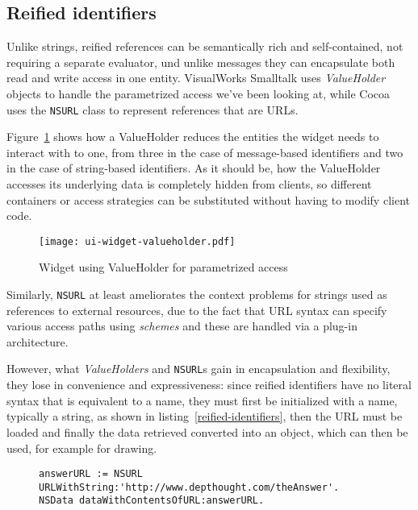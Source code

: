 \documentclass[preprint,authoryear]{llncs}
\begin{document}
\subsection{Reified identifiers}


Unlike strings, reified references can be semantically rich and self-contained, not requiring
a separate evaluator, und unlike
messages they can encapsulate both read and write access in one entity.  VisualWorks 
Smalltalk uses \emph{ValueHolder} objects to handle the parametrized access we've been
looking at, while Cocoa uses the {\tt NSURL} class to represent references that are URLs.

Figure~\ref{ui-widget-valueholder} shows how a ValueHolder reduces the entities the widget
needs to interact with to one, from three in the case of message-based identifiers and two
in the case of string-based identifiers.  As it should be, how the ValueHolder accesses 
its underlying data is completely hidden from clients, so different containers or access
strategies can be substituted without having to modify client code.

\begin{figure}[htbp]
\begin{center}
\texttt{[image: ui-widget-valueholder.pdf]}
\caption{Widget using ValueHolder for parametrized access}
\label{ui-widget-valueholder}
\end{center}
\end{figure}

Similarly, {\tt NSURL} at least ameliorates the context problems for strings used as
references to external resources, due to the fact that URL syntax can specify 
various access paths using \emph{schemes} and these are handled via a plug-in 
architecture. 

However, what \emph{ValueHolders} and {\tt NSURL}s gain in encapsulation and flexibility,
they lose in convenience and expressiveness:   since reified identifiers have no literal
syntax that is equivalent to a name, they must first be initialized with a name, typically
a string, as shown in listing~\ref{reified-identifiers}, then the URL must be loaded and
finally the data retrieved converted into an object, which can then be used, for example
for drawing. 


\begin{figure}[htbp]
\begin{lstlisting}[style=numbers,label=reified-identifiers,caption=Retrieving image data stored on flickr.com.]
answerURL := NSURL URLWithString:'http://www.depthought.com/theAnswer'.
NSData dataWithContentsOfURL:answerURL.
\end{lstlisting}
\end{figure}
\end{document}
